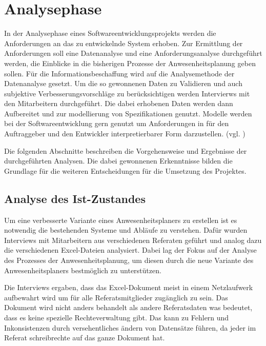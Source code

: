 \section{Analysephase}
\label{sec:Analysephase}
In der Analysephase eines Softwareentwicklungsprojekts werden die Anforderungen an das zu entwickelnde System erhoben. Zur Ermittlung der Anforderungen soll eine Datenanalyse und eine Anforderungsanalyse durchgeführt werden, die Einblicke in die bisherigen Prozesse der Anwesenheitsplanung geben sollen. Für die Informationsbeschaffung wird auf die Analysemethode der Datenanalyse gesetzt. Um die so gewonnenen Daten zu Validieren und auch subjektive Verbesserungsvorschläge zu berücksichtigen werden Intervierws mit den Mitarbeitern durchgeführt. Die dabei erhobenen Daten werden dann Aufbereitet und zur modellierung von Spezifikationen genutzt. Modelle werden bei der Softwareentwicklung gern genutzt um Anforderungen in für den Auftraggeber und den Entwickler interpretierbarer Form darzustellen. (vgl. \cite[S. 43]{dumke-2003})

Die folgenden Abschnitte beschreiben die Vorgehensweise und Ergebnisse der durchgeführten Analysen. Die dabei gewonnenen Erkenntnisse bilden die Grundlage für die weiteren Entscheidungen für die Umsetzung des Projektes.


\subsection{Analyse des Ist-Zustandes}
\label{sec:Ist-Zustand}
Um eine verbesserte Variante eines Anwesenheitsplaners zu erstellen ist es notwendig die bestehenden Systeme und Abläufe zu verstehen. Dafür wurden Interviews mit Mitarbeitern aus verschiedenen Referaten geführt und analog dazu die verschiedenen Excel-Dateien analysiert. Dabei lag der Fokus auf der Analyse des Prozesses der Anwesenheitsplanung, um diesen durch die neue Variante des Anwesenheitsplaners bestmöglich zu unterstützen.

Die Interviews ergaben, dass das Excel-Dokument meist in einem Netzlaufwerk aufbewahrt wird um für alle Referatsmitglieder zugänglich zu sein. Das Dokument wird nicht anders behandelt als andere Referatsdaten was bedeutet, dass es keine spezielle Rechteverwaltung gibt. Das kann zu Fehlern und Inkonsistenzen durch versehentliches ändern von Datensätze führen, da jeder im Referat schreibrechte auf das ganze Dokument hat.

